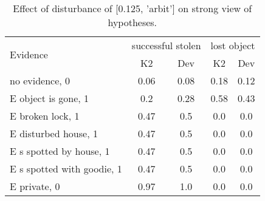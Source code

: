 \begin{table}\begin{tabular}{l|cc|cc}\toprule\multirow{2}{*}{Evidence} & \multicolumn{2}{c}{successful stolen}& \multicolumn{2}{c}{lost object}\\& {K2} & {Dev}& {K2} & {Dev}\\\midrule
no evidence, 0 & 0.06&0.08&\cellcolor{Bittersweet}0.18&\cellcolor{Bittersweet}0.12\\E object is gone, 1 & \cellcolor{Bittersweet}0.2&\cellcolor{Bittersweet}0.28&\cellcolor{Bittersweet}0.58&\cellcolor{Bittersweet}0.43\\E broken lock, 1 & 0.47&0.5&0.0&0.0\\E disturbed house, 1 & 0.47&0.5&0.0&0.0\\E s spotted by house, 1 & 0.47&0.5&0.0&0.0\\E s spotted with goodie, 1 & 0.47&0.5&0.0&0.0\\E private, 0 & 0.97&1.0&0.0&0.0\\\bottomrule\end{tabular}\caption{Effect of disturbance of [0.125, 'arbit'] on strong view of hypotheses.}\end{table}